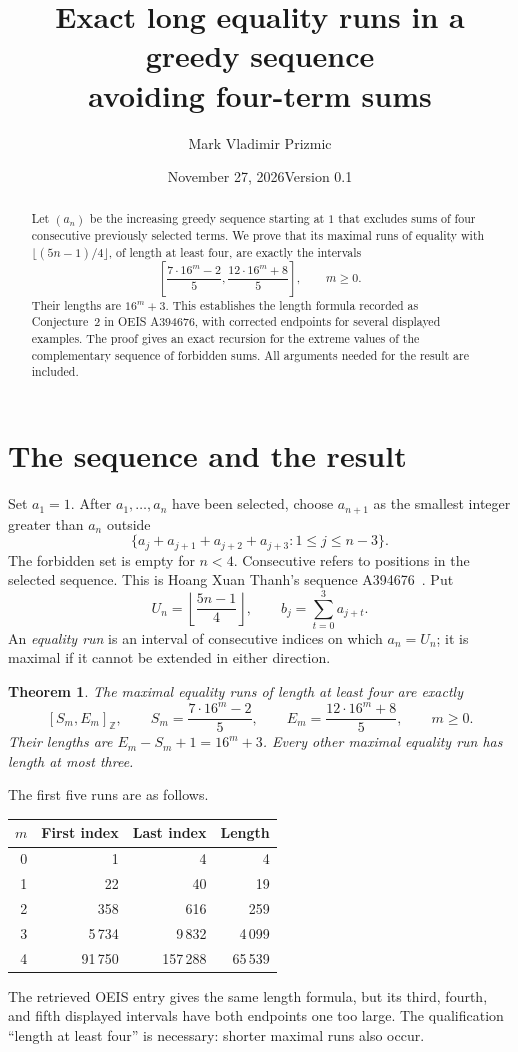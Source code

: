 \documentclass[11pt]{article}
\title{Exact long equality runs in a greedy sequence\protect\\avoiding four-term sums}
\author{Mark Vladimir Prizmic}
\date{November 27, 2026\quad Version 0.1}
\newtheorem{theorem}{Theorem}
\begin{document}
\maketitle
\begin{abstract}
Let $(a_n)$ be the increasing greedy sequence starting at $1$ that excludes
sums of four consecutive previously selected terms. We prove that its maximal
runs of equality with $\lfloor(5n-1)/4\rfloor$, of length at least four, are
exactly the intervals
\[
 \left[\frac{7\cdot16^m-2}{5},\frac{12\cdot16^m+8}{5}\right],
 \qquad m\ge0.
\]
Their lengths are $16^m+3$. This establishes the length formula recorded as
Conjecture~2 in OEIS A394676, with corrected endpoints for several displayed
examples. The proof gives an exact recursion for the extreme values of the
complementary sequence of forbidden sums. All arguments needed for the result
are included.
\end{abstract}

\section{The sequence and the result}

Set $a_1=1$. After $a_1,\ldots,a_n$ have been selected, choose $a_{n+1}$ as
the smallest integer greater than $a_n$ outside
\[
 \{a_j+a_{j+1}+a_{j+2}+a_{j+3}:1\le j\le n-3\}.
\]
The forbidden set is empty for $n<4$. Consecutive refers to positions in the
selected sequence. This is Hoang Xuan Thanh's sequence A394676~\cite{oeis}.
Put
\[
 U_n=\left\lfloor\frac{5n-1}{4}\right\rfloor,
 \qquad b_j=\sum_{t=0}^3a_{j+t}.
\]
An \emph{equality run} is an interval of consecutive indices on which $a_n=U_n$;
it is maximal if it cannot be extended in either direction.

\begin{theorem}\label{thm:runs}
The maximal equality runs of length at least four are exactly
\begin{equation}\label{eq:runs}
 [S_m,E_m]_{\mathbb Z},\qquad
 S_m=\frac{7\cdot16^m-2}{5},\qquad
 E_m=\frac{12\cdot16^m+8}{5},\qquad m\ge0.
\end{equation}
Their lengths are $E_m-S_m+1=16^m+3$. Every other maximal equality run has
length at most three.
\end{theorem}

The first five runs are as follows.
\begin{center}
\begin{tabular}{rrrr}
\toprule
$m$ & First index & Last index & Length\\
\midrule
0&1&4&4\\
1&22&40&19\\
2&358&616&259\\
3&5\,734&9\,832&4\,099\\
4&91\,750&157\,288&65\,539\\
\bottomrule
\end{tabular}
\end{center}
The retrieved OEIS entry gives the same length formula, but its third, fourth,
and fifth displayed intervals have both endpoints one too large. The
qualification ``length at least four'' is necessary: shorter maximal runs
also occur.
\end{document}

